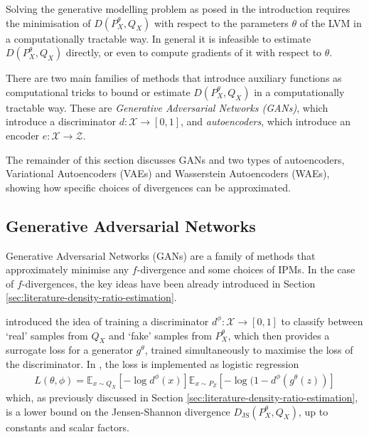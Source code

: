 Solving the generative modelling problem as posed in the introduction requires the minimisation of $D(P^\theta_X, Q_X)$ with respect to the parameters $\theta$ of the LVM in a computationally tractable way.
In general it is infeasible to estimate $D(P^\theta_X, Q_X)$ directly, or even to compute gradients of it with respect to $\theta$. 


There are two main families of methods that introduce auxiliary functions as computational tricks to bound or estimate $D(P^\theta_X, Q_X)$ in a computationally tractable way.
These are \emph{Generative Adversarial Networks (GANs)}, which introduce a discriminator $d:\mathcal{X} \to [0,1]$, and \emph{autoencoders}, which introduce an encoder $e:\mathcal{X} \to \mathcal{Z}$.

The remainder of this section discusses GANs and two types of autoencoders, Variational Autoencoders (VAEs) and Wasserstein Autoencoders (WAEs), showing how specific choices of divergences can be approximated.

\subsection{Generative Adversarial Networks}

Generative Adversarial Networks (GANs) are a family of methods that approximately minimise any $f$-divergence and some choices of IPMs. 
In the case of $f$-divergences, the key ideas have been already introduced in Section \ref{sec:literature-density-ratio-estimation}.

\cite{goodfellow2014generative} introduced the idea of training a discriminator $d^\phi: \mathcal{X} \to [0,1]$ to classify between `real' samples from $Q_X$ and `fake' samples from $P^\theta_X$, which then provides a surrogate loss for a generator $g^\theta$, trained simultaneously to maximise the loss of the discriminator. 
In \cite{goodfellow2014generative}, the loss is implemented as logistic regression
%
\begin{align*}
L(\theta, \phi) = \mathbb{E}_{x\sim Q_X}\left[ -\log d^\phi(x) \right] \mathbb{E}_{x \sim P_Z} \left[- \log(1 - d^\phi(g^\theta(z)) \right]
\end{align*}
%
which, as previously discussed in Section \ref{sec:literature-density-ratio-estimation}, is a lower bound on the Jensen-Shannon divergence $D_{\text{JS}}(P^\theta_X, Q_X)$, up to constants and scalar factors.

